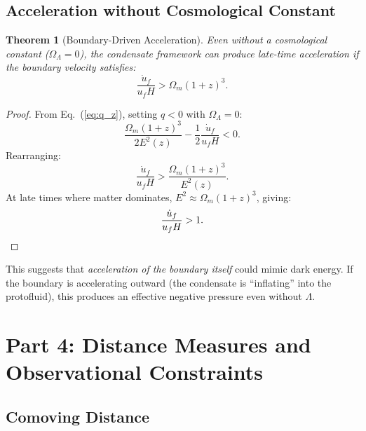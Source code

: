 \documentclass[11pt,a4paper]{article}
\newcommand{\OmegaLam}{\ensuremath{\Omega_\Lambda}}
\newcommand{\OmegaM}{\ensuremath{\Omega_m}}
\newtheorem{theorem}{Theorem}[section]
\theoremstyle{definition}
\theoremstyle{remark}
\begin{document}
\subsection{Acceleration without Cosmological Constant}
\label{sec:acceleration_no_Lambda}

\begin{theorem}[Boundary-Driven Acceleration]
\label{thm:boundary_acceleration}
Even without a cosmological constant ($\OmegaLam = 0$), the condensate framework can produce late-time acceleration if the boundary velocity satisfies:
\begin{equation}
\label{eq:boundary_acceleration_condition}
\boxed{\frac{\dot{u}_f}{u_f H} > \OmegaM(1+z)^3.}
\end{equation}
\end{theorem}

\begin{proof}
From Eq.~(\ref{eq:q_z}), setting $q < 0$ with $\OmegaLam = 0$:
\begin{equation}
\frac{\OmegaM(1+z)^3}{2E^2(z)} - \frac{1}{2}\frac{\dot{u}_f}{u_f H} < 0.
\end{equation}
Rearranging:
\begin{equation}
\frac{\dot{u}_f}{u_f H} > \frac{\OmegaM(1+z)^3}{E^2(z)}.
\end{equation}
At late times where matter dominates, $E^2 \approx \OmegaM(1+z)^3$, giving:
\begin{equation}
\frac{\dot{u}_f}{u_f H} > 1. \qedhere
\end{equation}
\end{proof}

This suggests that \emph{acceleration of the boundary itself} could mimic dark energy. If the boundary is accelerating outward (the condensate is ``inflating'' into the protofluid), this produces an effective negative pressure even without $\Lambda$.

\section{Part 4: Distance Measures and Observational Constraints}
\label{sec:distances}

\subsection{Comoving Distance}
\label{sec:comoving_distance}
\end{document}
